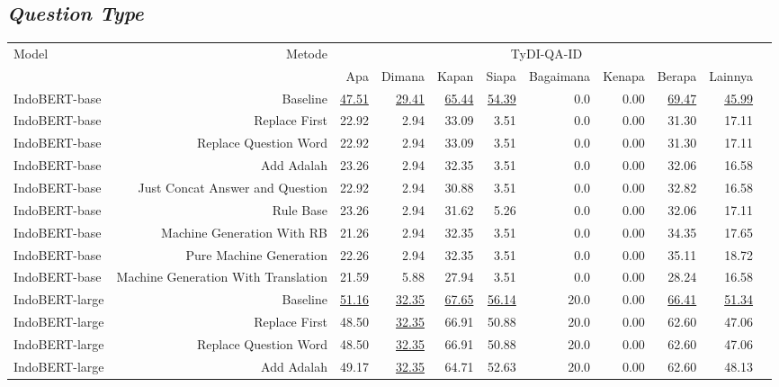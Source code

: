 \subsection{\emph{Question Type}}
\begin{table}[H]\centering
\tiny
\begin{tabular}{lrrrrrrrrrr}\toprule
\multirow{2}{*}{Model} &\multirow{2}{*}{Metode} &\multicolumn{8}{c}{TyDI-QA-ID} \\\cmidrule{3-10}
& &Apa &Dimana &Kapan &Siapa &Bagaimana &Kenapa &Berapa &Lainnya \\\midrule
IndoBERT-base &Baseline &\underline{47.51} &\underline{29.41} &\underline{65.44} &\underline{54.39} &0.0 &0.00 &\underline{69.47} &\underline{45.99} \\
IndoBERT-base &Replace First &22.92 &2.94 &33.09 &3.51 &0.0 &0.00 &31.30 &17.11 \\
IndoBERT-base &Replace Question Word &22.92 &2.94 &33.09 &3.51 &0.0 &0.00 &31.30 &17.11 \\
IndoBERT-base &Add Adalah &23.26 &2.94 &32.35 &3.51 &0.0 &0.00 &32.06 &16.58 \\
IndoBERT-base &Just Concat Answer and Question &22.92 &2.94 &30.88 &3.51 &0.0 &0.00 &32.82 &16.58 \\
IndoBERT-base &Rule Base &23.26 &2.94 &31.62 &5.26 &0.0 &0.00 &32.06 &17.11 \\
IndoBERT-base &Machine Generation With RB &21.26 &2.94 &32.35 &3.51 &0.0 &0.00 &34.35 &17.65 \\
IndoBERT-base &Pure Machine Generation &22.26 &2.94 &32.35 &3.51 &0.0 &0.00 &35.11 &18.72 \\
IndoBERT-base &Machine Generation With Translation &21.59 &5.88 &27.94 &3.51 &0.0 &0.00 &28.24 &16.58 \\
\hline
IndoBERT-large &Baseline &\underline{51.16} &\underline{32.35} &\underline{67.65} &\underline{56.14} &20.0 &0.00 &\underline{66.41} &\underline{51.34} \\
IndoBERT-large &Replace First &48.50 &\underline{32.35} &66.91 &50.88 &20.0 &0.00 &62.60 &47.06 \\
IndoBERT-large &Replace Question Word &48.50 &\underline{32.35} &66.91 &50.88 &20.0 &0.00 &62.60 &47.06 \\
IndoBERT-large &Add Adalah &49.17 &\underline{32.35} &64.71 &52.63 &20.0 &0.00 &62.60 &48.13 \\

\end{tabular}
\end{table}
